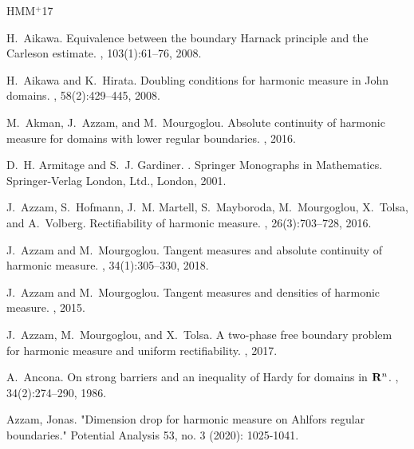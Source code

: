 \documentclass{article}
\newcounter{lem}
\theoremstyle{plain}
\theoremstyle{plain}
\theoremstyle{definition}
\theoremstyle{plain}
\begin{document}

\newcommand{\etalchar}[1]{$^{#1}$}
\def\cprime{$'$}
\begin{thebibliography}{HMM{\etalchar{+}}17}
\footnotesize


H.~Aikawa.
\newblock Equivalence between the boundary {H}arnack principle and the
  {C}arleson estimate.
, 103(1):61--76, 2008.


H.~Aikawa and K.~Hirata.
\newblock Doubling conditions for harmonic measure in {J}ohn domains.
, 58(2):429--445, 2008.



M.~Akman, J.~Azzam, and M.~Mourgoglou.
\newblock Absolute continuity of harmonic measure for domains with lower
  regular boundaries.
, 2016.

D.~H. Armitage and S.~J. Gardiner.
.
\newblock Springer Monographs in Mathematics. Springer-Verlag London, Ltd.,
  London, 2001.
  
  

\bibitem[AHM{\etalchar{+}}16]{AHMMMTV16}
J.~Azzam, S.~Hofmann, J.~M. Martell, S.~Mayboroda, M.~Mourgoglou, X.~Tolsa, and
  A.~Volberg.
\newblock Rectifiability of harmonic measure.
, 26(3):703--728, 2016.


J.~Azzam and M.~Mourgoglou.
\newblock Tangent measures and absolute continuity of harmonic measure.
, 34(1):305--330, 2018.


J.~Azzam and M.~Mourgoglou.
\newblock Tangent measures and densities of harmonic measure.
, 2015.

J.~Azzam, M.~Mourgoglou, and X.~Tolsa.
\newblock A two-phase free boundary problem for harmonic measure and uniform
  rectifiability.
, 2017.

A.~Ancona.
\newblock On strong barriers and an inequality of {H}ardy for domains in {${\bf
  R}^n$}.
, 34(2):274--290, 1986.

 Azzam, Jonas. "Dimension drop for harmonic measure on Ahlfors regular boundaries." Potential Analysis 53, no. 3 (2020): 1025-1041.


\end{thebibliography}
\end{document}
